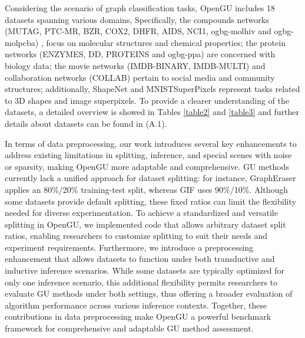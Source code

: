 Considering the scenario of graph classification tasks, OpenGU includes 18 datasets spanning various domains, Specifically, the compounds networks (MUTAG, PTC-MR, BZR, COX2, DHFR, AIDS, NCI1, ogbg-molhiv and ogbg-molpcba) \cite{MUTAG,PTC,BZR_COX_DHFR,AIDS,NCI1,hu2020ogb}, focus on molecular structures and chemical properties; the protein networks (ENZYMES, DD, PROTEINS and ogbg-ppa) \cite{chen2024fedgl,DD,PROTEINS,hu2020ogb} are concerned with biology data; the movie networks (IMDB-BINARY, IMDB-MULTI) \cite{IMDB} and collaboration networks (COLLAB) \cite{COLLAB} pertain to social media and community structures; additionally, ShapeNet \cite{ShapeNet} and MNISTSuperPixels \cite{MNISTSuperPixels} represent tasks related to 3D shapes and image superpixels. 
To provide a clearer understanding of the datasets, a detailed overview is showed in Tables \ref{table2} and \ref{table3} and further details about datasets can be found in \cite{OpenGU2025} (A.1).

In terms of data preprocessing, our work introduces several key enhancements to address existing limitations in splitting, inference, and special scenes with noise or sparsity,
making OpenGU more adaptable and comprehensive. GU methods currently lack a unified approach for dataset splitting: for instance, GraphEraser applies an 80\%/20\% training-test split, whereas GIF uses 90\%/10\%.
Although some datasets provide default splitting, these fixed ratios can limit the flexibility needed for diverse experimentation. 
To achieve a standardized and versatile splitting in OpenGU, we implemented code that allows arbitrary dataset split ratios, enabling researchers to customize splitting to suit their needs and experiment requirements.
Furthermore, we introduce a preprocessing enhancement that allows datasets to function under both transductive and inductive inference scenarios. While some datasets are typically optimized for only one inference scenario, this additional flexibility permits researchers to evaluate GU methods under both settings, thus offering a broader evaluation of algorithm performance across various inference contexts. Together, these contributions in data preprocessing make OpenGU a powerful benchmark framework for comprehensive and adaptable GU method assessment.


